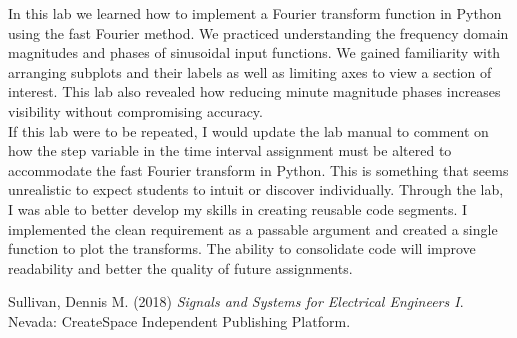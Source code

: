 \documentclass[12pt]{report}
\begin{document}
In this lab we learned how to implement a Fourier transform function in Python using the fast Fourier method. We practiced understanding the frequency domain magnitudes and phases of sinusoidal input functions. We gained familiarity with arranging subplots and their labels as well as limiting axes to view a section of interest. This lab also revealed how reducing minute magnitude phases increases visibility without compromising accuracy. \\

If this lab were to be repeated, I would update the lab manual to comment on how the step variable in the time interval assignment must be altered to accommodate the fast Fourier transform in Python. This is something that seems unrealistic to expect students to intuit or discover individually. Through the lab, I was able to better develop my skills in creating reusable code segments. I implemented the clean requirement as a passable argument and created a single function to plot the transforms. The ability to consolidate code will improve readability and better the quality of future assignments.

\newpage
\begin{thebibliography}{111}
	
	Sullivan, Dennis M. (2018) {\it  Signals and Systems for Electrical Engineers I}. Nevada: CreateSpace Independent Publishing Platform.
	
\end{thebibliography}
\end{document}

